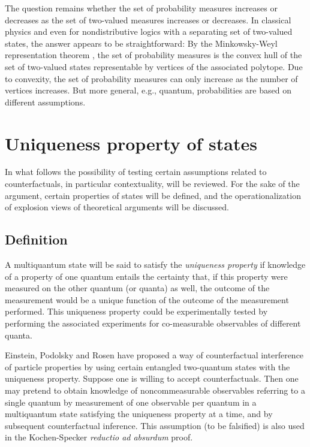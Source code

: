 \documentclass{aipproc}
\begin{document}
The question remains whether the set of
probability measures increases or decreases as the set of two-valued measures increases or decreases.
In classical physics and even for nondistributive logics with a separating set of two-valued states,
the answer appears to be straightforward:
By the Minkowsky-Weyl representation theorem \cite[p.29]{ziegler},
the set of probability measures is the convex hull of the set of two-valued states representable by
vertices of the associated polytope.
Due to convexity, the set of probability measures can only increase as the number of vertices increases.
But more general, e.g., quantum, probabilities are based on different assumptions.


\section{Uniqueness property of states}

In what follows the possibility of testing certain assumptions related to counterfactuals,
in particular contextuality, will be reviewed.
For the sake of the argument, certain properties of states will be defined,
and the operationalization of explosion views of theoretical arguments will be discussed.

\subsection{Definition}

A multiquantum state will be said to satisfy the {\em uniqueness property} if
knowledge of a property of one quantum entails the certainty
that, if this property
were measured on the other quantum (or quanta) as well, the outcome of the measurement would be
a unique function of the outcome of the measurement performed.
This uniqueness property could be experimentally tested by performing the associated experiments
for co-measurable observables of different quanta.

Einstein, Podolsky and Rosen \cite{epr} have proposed a way of counterfactual interference
of particle properties by using certain entangled two-quantum states with the uniqueness property.
Suppose one is willing to accept counterfactuals.
Then
one may pretend to obtain knowledge of
noncommeasurable observables referring to a single quantum
by measurement of one observable per quantum
in a multiquantum state satisfying the uniqueness property at a time,
and by subsequent counterfactual inference.
This assumption (to be falsified) is also used in the Kochen-Specker {\em reductio ad absurdum} proof.
\end{document}
